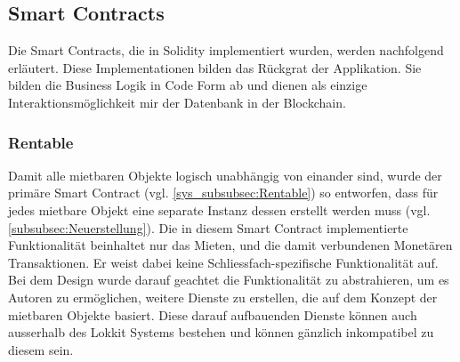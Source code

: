\subsection{Smart Contracts}
\label{subsec:Smart_Contracts}
Die Smart Contracts, die in Solidity implementiert wurden, werden nachfolgend erläutert. Diese Implementationen bilden das Rückgrat der Applikation. Sie bilden die Business Logik in Code Form ab und dienen als einzige Interaktionsmöglichkeit mir der Datenbank in der Blockchain.\cite[Introduction to Smart Contracts]{solidity.readthedocs.io}

\subsubsection{Rentable}
\label{subsubsec:Rentable}
Damit alle mietbaren Objekte logisch unabhängig von einander sind, wurde der primäre Smart Contract (vgl. \ref{sys_subsubsec:Rentable}) so entworfen, dass für jedes mietbare Objekt eine separate Instanz dessen erstellt werden muss (vgl. \ref{subsubsec:Neuerstellung}). Die in diesem Smart Contract implementierte Funktionalität beinhaltet nur das Mieten, und die damit verbundenen Monetären Transaktionen. Er weist dabei keine Schliessfach-spezifische Funktionalität auf. Bei dem Design wurde darauf geachtet die Funktionalität zu abstrahieren, um es Autoren zu ermöglichen, weitere Dienste zu erstellen, die auf dem Konzept der mietbaren Objekte basiert. Diese darauf aufbauenden Dienste können auch ausserhalb des Lokkit Systems bestehen und können gänzlich inkompatibel zu diesem sein.

